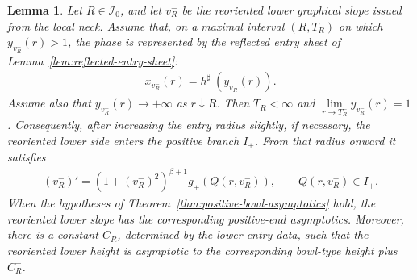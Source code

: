 \documentclass{amsart}
\theoremstyle{plain}
\newtheorem{lemma}[theorem]{Lemma}
\theoremstyle{mainintrothm}
\theoremstyle{definition}
\begin{document}
\begin{lemma}
	\label{lem:lower-reflected-positive-entry}
	Let $R\in\mathcal I_0$, and let $v_R^-$ be the reoriented lower graphical
	slope issued from the local neck.  Assume that, on a maximal interval
	$(R,T_R)$ on which $y_{v_R^-}(r)>1$, the phase is represented by the
	reflected entry sheet of Lemma~\ref{lem:reflected-entry-sheet}:
	\begin{align*}
		x_{v_R^-}(r)=h_-^\sharp(y_{v_R^-}(r)).
	\end{align*}
	Assume also that $y_{v_R^-}(r)\to+\infty$ as $r\downarrow R$.  Then
	$T_R<\infty$ and $\lim\limits_{r\to T_R^-}y_{v_R^-}(r)=1$. Consequently, after increasing the entry radius slightly, if necessary, the
	reoriented lower side enters the positive branch $I_+$.  From that radius
	onward it satisfies
	\begin{align}
		\label{eq:lower-reflected-positive-branch-equation}
		(v_R^-)'
		=
		(1+(v_R^-)^2)^{\beta+1}
		g_+(Q(r,v_R^-)),
		\qquad
		Q(r,v_R^-)\in I_+.
	\end{align}
	When the hypotheses of Theorem~\ref{thm:positive-bowl-asymptotics} hold, the
	reoriented lower slope has the corresponding positive-end asymptotics.  Moreover,
	there is a constant $C_R^-$, determined by the lower entry data, such that the
	reoriented lower height is asymptotic to the corresponding bowl-type height plus
	$C_R^-$.
\end{lemma}
\end{document}
